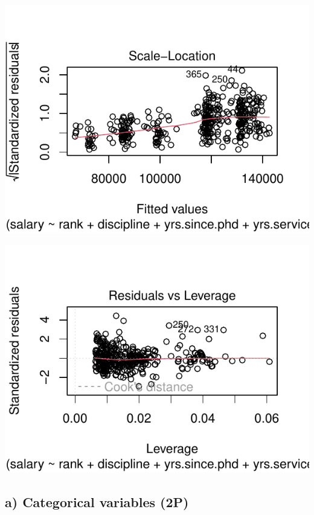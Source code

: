 \documentclass[
]{article}
\begin{document}
\begin{center}\includegraphics{compulsory_files/figure-latex/load_data-3} \end{center}

\begin{center}\includegraphics{compulsory_files/figure-latex/load_data-4} \end{center}

\hypertarget{a-categorical-variables-2p}{%
\subsection{a) Categorical variables
(2P)}\label{a-categorical-variables-2p}}
\end{document}
